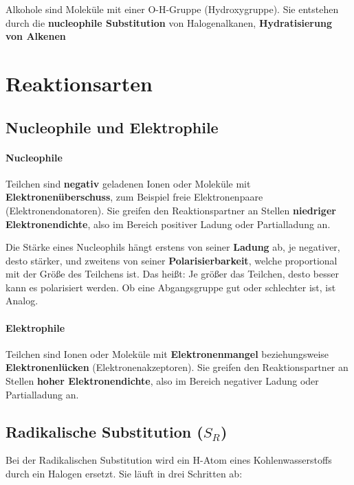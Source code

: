 \documentclass[a4paper]{article}
\begin{document}
Alkohole sind Moleküle mit einer O-H-Gruppe (Hydroxygruppe). Sie entstehen durch die
\textbf{nucleophile Substitution} von Halogenalkanen, \textbf{Hydratisierung von Alkenen}








\section{Reaktionsarten}

\subsection{Nucleophile und Elektrophile}
\paragraph{Nucleophile} 
Teilchen sind \textbf{negativ} geladenen Ionen oder Moleküle mit \textbf{Elektronenüberschuss}, zum Beispiel freie Elektronenpaare (Elektronendonatoren).
Sie greifen den Reaktionspartner an Stellen \textbf{niedriger Elektronendichte}, also im Bereich positiver Ladung oder Partialladung an.

Die Stärke eines Nucleophils hängt erstens von seiner \textbf{Ladung} ab, je negativer, desto stärker, und zweitens von seiner
\textbf{Polarisierbarkeit}, welche proportional mit der Größe des Teilchens ist. Das heißt: Je größer das Teilchen, desto besser
kann es polarisiert werden. Ob eine Abgangsgruppe gut oder schlechter ist, ist Analog.

\paragraph{Elektrophile} Teilchen sind Ionen oder Moleküle mit \textbf{Elektronenmangel} beziehungsweise \textbf{Elektronenlücken} (Elektronenakzeptoren).
Sie greifen den Reaktionspartner an Stellen \textbf{hoher Elektronendichte}, also im Bereich negativer Ladung oder Partialladung an.

\subsection{Radikalische Substitution ($S_R$)}

Bei der Radikalischen Substitution wird ein H-Atom eines Kohlenwasserstoffs durch ein Halogen ersetzt.
Sie läuft in drei Schritten ab:\\
\end{document}

